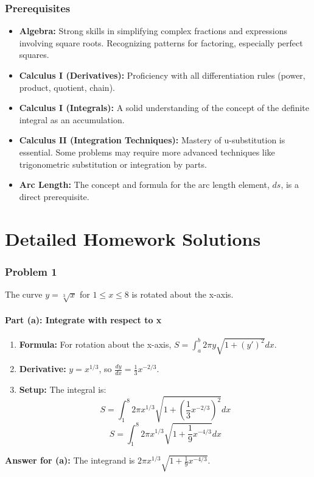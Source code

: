 \documentclass{article}
\begin{document}
\section{Prerequisites}
\begin{itemize}
    \item \textbf{Algebra:} Strong skills in simplifying complex fractions and expressions involving square roots. Recognizing patterns for factoring, especially perfect squares.
    \item \textbf{Calculus I (Derivatives):} Proficiency with all differentiation rules (power, product, quotient, chain).
    \item \textbf{Calculus I (Integrals):} A solid understanding of the concept of the definite integral as an accumulation.
    \item \textbf{Calculus II (Integration Techniques):} Mastery of u-substitution is essential. Some problems may require more advanced techniques like trigonometric substitution or integration by parts.
    \item \textbf{Arc Length:} The concept and formula for the arc length element, \(ds\), is a direct prerequisite.
\end{itemize}

\part*{Detailed Homework Solutions}

\section{Problem 1}
The curve \(y = \sqrt[3]{x}\) for \(1 \le x \le 8\) is rotated about the x-axis.
\subsection{Part (a): Integrate with respect to x}
\begin{enumerate}
    \item \textbf{Formula:} For rotation about the x-axis, \(S = \int_{a}^{b} 2\pi y \sqrt{1 + (y')^2} dx\).
    \item \textbf{Derivative:} \(y = x^{1/3}\), so \(\frac{dy}{dx} = \frac{1}{3}x^{-2/3}\).
    \item \textbf{Setup:} The integral is:
    \[ S = \int_{1}^{8} 2\pi x^{1/3} \sqrt{1 + \left(\frac{1}{3}x^{-2/3}\right)^2} dx \]
    \[ S = \int_{1}^{8} 2\pi x^{1/3} \sqrt{1 + \frac{1}{9}x^{-4/3}} dx \]
\end{enumerate}
\textbf{Answer for (a):} The integrand is \(2\pi x^{1/3} \sqrt{1 + \frac{1}{9}x^{-4/3}}\).
\end{document}
